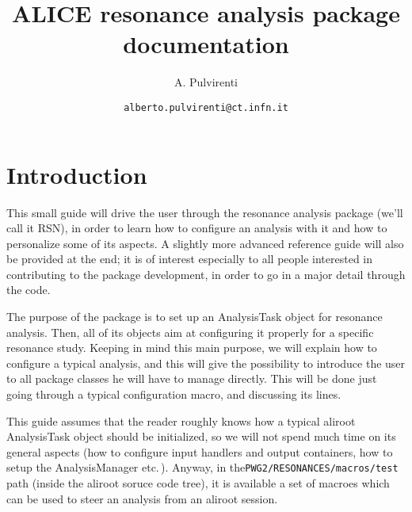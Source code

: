 \documentclass[12pt,a4paper]{article}
\title{ALICE resonance analysis package documentation}
\author{A. Pulvirenti}
\date{\tt alberto.pulvirenti@ct.infn.it}
\begin{document}
\lstset{language=C++}
\lstset{basicstyle=\tiny}

\maketitle

\section{Introduction}

This small guide will drive the user through the resonance analysis package (we'll call it RSN), in order to learn how to configure an analysis with it and how to personalize some of its aspects.
A slightly more advanced reference guide will also be provided at the end; it is of interest especially to all people interested in contributing to the package development, in order to go in a major detail through the code.

The purpose of the package is to set up an AnalysisTask object for resonance analysis.
Then, all of its objects aim at configuring it properly for a specific resonance study.
Keeping in mind this main purpose, we will explain how to configure a typical analysis, and this will give the possibility to introduce the user to all package classes he will have to manage directly.
This will be done just going through a typical configuration macro, and discussing its lines.

This guide assumes that the reader roughly knows how a typical aliroot AnalysisTask object should be initialized, so we will not spend much time on its general aspects (how to configure input handlers and output containers, how to setup the AnalysisManager etc.\,).
Anyway, in  the{\tt PWG2/RESONANCES/macros/test} path (inside the aliroot soruce code tree), it is available a set of macroes which can be used to steer an analysis from an aliroot session.
\end{document}
